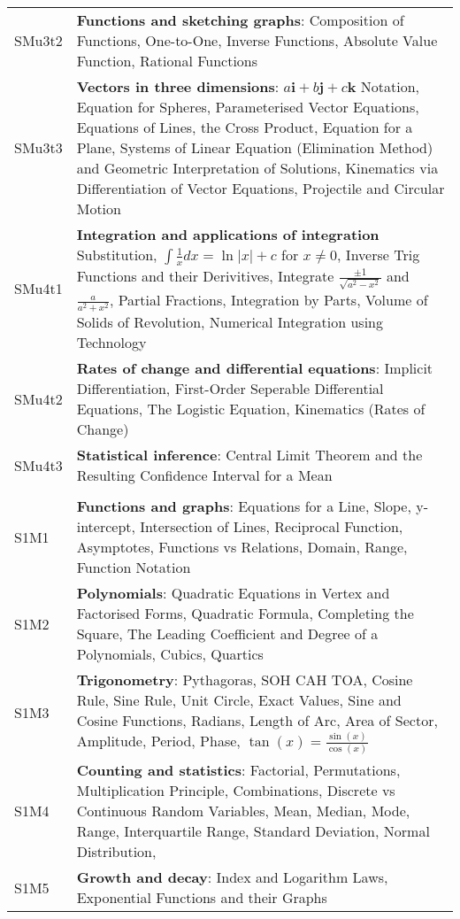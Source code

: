 \documentclass[varwidth=144mm, 12pt]{standalone}
\begin{document}
\begin{longtable}{lp{}}
SMu3t2 & \textbf{Functions and sketching graphs}: Composition of Functions, One-to-One, Inverse Functions, Absolute Value Function, Rational Functions \\
SMu3t3 & \textbf{Vectors in three dimensions}: $a\textbf{i} + b\textbf{j} + c\textbf{k}$ Notation, Equation for Spheres, Parameterised Vector Equations, Equations of Lines, the Cross Product, Equation for a Plane, Systems of Linear Equation (Elimination Method) and Geometric Interpretation of Solutions, Kinematics via Differentiation of Vector Equations, Projectile and Circular Motion \\
SMu4t1 & \textbf{Integration and applications of integration} Substitution, $\int{\frac{1}{x}dx} = \ln{|x|} + c$ for $x \neq 0$, Inverse Trig Functions and their Derivitives, Integrate $\frac{\pm1}{\sqrt{a^2-x^2}}$ and $\frac{a}{a^2 + x^2}$, Partial Fractions, Integration by Parts, Volume of Solids of Revolution, Numerical Integration using Technology \\
SMu4t2 & \textbf{Rates of change and differential equations}: Implicit Differentiation, First-Order Seperable Differential Equations, The Logistic Equation, Kinematics (Rates of Change) \\
SMu4t3 & \textbf{Statistical inference}: Central Limit Theorem and the Resulting Confidence Interval for a Mean \\
& \\
S1M1 & \textbf{Functions and graphs}: Equations for a Line, Slope, y-intercept, Intersection of Lines, Reciprocal Function, Asymptotes, Functions vs Relations, Domain, Range, Function Notation \\
S1M2 & \textbf{Polynomials}: Quadratic Equations in Vertex and Factorised Forms, Quadratic Formula, Completing the Square, The Leading Coefficient and Degree of a Polynomials, Cubics, Quartics\\
S1M3 & \textbf{Trigonometry}: Pythagoras, SOH CAH TOA, Cosine Rule, Sine Rule, Unit Circle, Exact Values, Sine and Cosine Functions, Radians, Length of Arc, Area of Sector, Amplitude, Period, Phase, $\tan(x) = \frac{\sin(x)}{\cos(x)}$ \\
S1M4 & \textbf{Counting and statistics}: Factorial, Permutations, Multiplication Principle, Combinations, Discrete vs Continuous Random Variables, Mean, Median, Mode, Range, Interquartile Range, Standard Deviation, Normal Distribution, \\
S1M5 & \textbf{Growth and decay}: Index and Logarithm Laws, Exponential Functions and their Graphs \\

\end{longtable}
\end{document}
